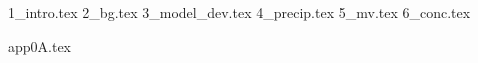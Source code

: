 \documentclass{uob-phd-thesis}
\begin{document}
\frontmatter

\tableofcontents
\listoftables
\listoffigures
\printglossary[type=\acronymtype,title=Abbreviations,toctitle=List of abbreviations]
\cleardoubleoddemptypage

\mainmatter

{1_intro.tex}
{2_bg.tex}
{3_model_dev.tex}
{4_precip.tex}
{5_mv.tex}
{6_conc.tex}


\appendix
{app0A.tex}

\backmatter
% 
\printbibliography


%
\end{document}
